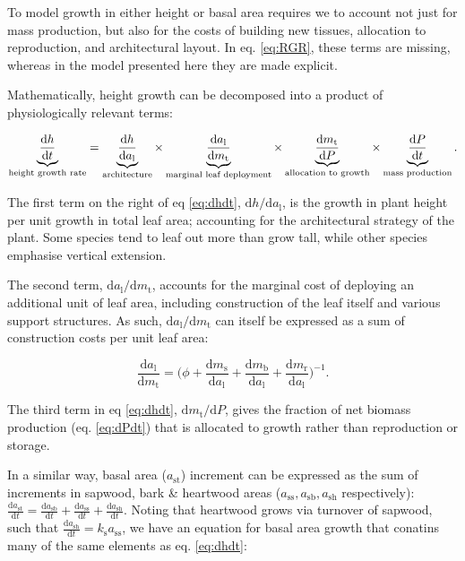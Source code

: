 \documentclass[12pt, a4paper]{article}
\begin{document}
To model growth in either height or basal area requires we to account
not just for mass production, but also for the costs of building new
tissues, allocation to reproduction, and architectural layout. In eq.
\ref{eq:RGR}, these terms are missing, whereas in the model presented
here they are made explicit.

Mathematically, height growth can be decomposed into a product of
physiologically relevant terms\citep{falster_influence_2011}:

\begin{equation} \label{eq:dhdt}
\underbrace{\strut\frac{\textrm{d}h}{\textrm{d}t}}_\textrm{height growth rate}= \underbrace{\strut\frac{\textrm{d}h}{\textrm{d}a_\textrm{l}}}_\textrm{architecture}
\times \underbrace{\strut\frac{\textrm{d}a_\textrm{l}}{\textrm{d}m_\textrm{t}}}_\textrm{marginal leaf deployment}
\times \underbrace{\strut\frac{\textrm{d}m_\textrm{t}}{\textrm{d}P}}_\textrm{allocation to growth}
\times \underbrace{\strut\frac{\textrm{d}P}{\textrm{d}t}}_\textrm{mass production}.
\end{equation}

The first term on the right of eq \ref{eq:dhdt},
\(\textrm{d}h / \textrm{d}a_\textrm{l}\), is the growth in plant height
per unit growth in total leaf area; accounting for the architectural
strategy of the plant. Some species tend to leaf out more than grow
tall, while other species emphasise vertical
extension\citep{poorter_architecture_2006}.

The second term, \(\textrm{d}a_\textrm{l} / \textrm{d}m_\textrm{t}\),
accounts for the marginal cost of deploying an additional unit of leaf
area, including construction of the leaf itself and various support
structures. As such, \(\textrm{d}a_\textrm{l} / \textrm{d}m_\textrm{t}\)
can itself be expressed as a sum of construction costs per unit leaf
area:

\begin{equation}\label{eq:daldmt}
\frac{\textrm{d}a_\textrm{l}}{\textrm{d}m_\textrm{t}}
= \big(\phi
 + \frac{\textrm{d}m_\textrm{s}}{\textrm{d}a_\textrm{l}} + \frac{\textrm{d}m_\textrm{b}}{\textrm{d}a_\textrm{l}} + \frac{\textrm{d}m_\textrm{r}}{\textrm{d}a_\textrm{l}}\big)^{-1}.
\end{equation}

The third term in eq \ref{eq:dhdt},
\(\textrm{d}m_\textrm{t} / \textrm{d}P\), gives the fraction of net
biomass production (eq. \ref{eq:dPdt}) that is allocated to growth
rather than reproduction or storage.

In a similar way, basal area (\(a_\textrm{st}\)) increment can be
expressed as the sum of increments in sapwood, bark \& heartwood areas
(\(a_\textrm{ss}, a_\textrm{sb}, a_\textrm{sh}\) respectively):
\(\frac{\textrm{d}a_\textrm{st}}{\textrm{d}t}= \frac{\textrm{d}a_\textrm{sb}}{\textrm{d}t} + \frac{\textrm{d}a_\textrm{ss}}{\textrm{d}t} + \frac{\textrm{d}a_\textrm{sh}}{\textrm{d}t}\).
Noting that heartwood grows via turnover of sapwood, such that
\(\frac{\textrm{d}a_\textrm{sh}}{\textrm{d}t} = k_\textrm{s} a_\textrm{ss}\),
we have an equation for basal area growth that conatins many of the same
elements as eq. \ref{eq:dhdt}:
\end{document}
